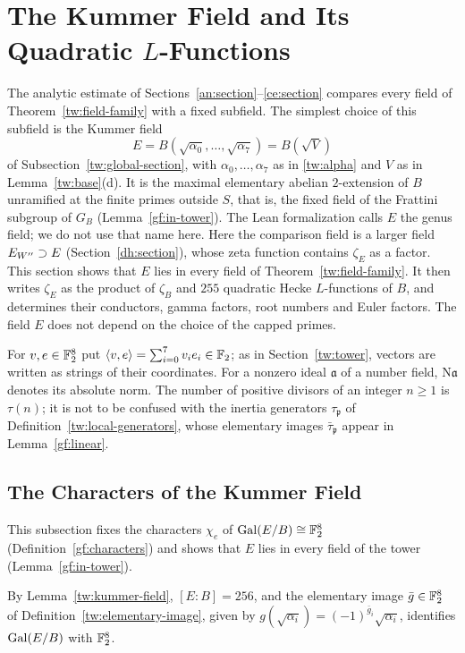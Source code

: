 \section{\texorpdfstring{The Kummer Field and Its Quadratic $L$-Functions}{The Kummer Field and Its Quadratic L-Functions}}\label{gf:section}

The analytic estimate of Sections~\ref{an:section}--\ref{ce:section}
compares every field of Theorem~\ref{tw:field-family} with a fixed subfield.
The simplest choice of this subfield is the Kummer field
\[
 E=B(\sqrt{\alpha_0},\ldots,\sqrt{\alpha_7})=B(\sqrt V)
\]
of Subsection~\ref{tw:global-section}, with $\alpha_0,\ldots,\alpha_7$ as in
\eqref{tw:alpha} and $V$ as in Lemma~\ref{tw:base}(d). It is the maximal
elementary abelian $2$-extension of $B$ unramified at the finite primes
outside $S$, that is, the fixed field of the Frattini subgroup of $G_B$
(Lemma~\ref{gf:in-tower}). The Lean formalization calls $E$ the genus field;
we do not use that name here. Here the comparison field is a larger field
$E_{W''}\supset E$ (Section~\ref{dh:section}), whose zeta function contains
$\zeta_E$ as a factor. This section shows that $E$ lies in every field of
Theorem~\ref{tw:field-family}. It then writes $\zeta_E$ as the product of
$\zeta_B$ and $255$ quadratic Hecke $L$-functions of $B$, and determines
their conductors, gamma factors, root numbers and Euler factors. The field
$E$ does not depend on the choice of the capped primes.

For $v,e\in\mathbb F_2^8$ put $\langle v,e\rangle=\sum_{i=0}^7v_ie_i\in\mathbb F_2$; as
in Section~\ref{tw:tower}, vectors are written as strings of their
coordinates. For a nonzero ideal $\mathfrak a$ of a number field,
$\mathrm N\mathfrak a$ denotes its absolute norm. The number of positive
divisors of an integer $n\ge1$ is $\tau(n)$; it is not to be confused with
the inertia generators $\tau_{\mathfrak p}$ of
Definition~\ref{tw:local-generators}, whose elementary images
$\bar\tau_{\mathfrak p}$ appear in Lemma~\ref{gf:linear}.

\subsection{The Characters of the Kummer Field}\label{gf:characters-section}
This subsection fixes the characters $\chi_e$ of $\operatorname{Gal}(E/B)\cong\mathbb F_2^8$
(Definition~\ref{gf:characters}) and shows that $E$ lies in every field of
the tower (Lemma~\ref{gf:in-tower}).

By Lemma~\ref{tw:kummer-field}, $[E:B]=256$, and the elementary image
$\bar g\in\mathbb F_2^8$ of Definition~\ref{tw:elementary-image}, given by
$g(\sqrt{\alpha_i})=(-1)^{\bar g_i}\sqrt{\alpha_i}$, identifies $\operatorname{Gal}(E/B)$
with $\mathbb F_2^8$.


